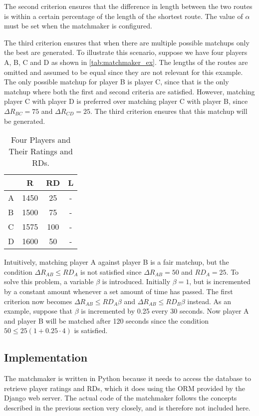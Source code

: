 The second criterion ensures that the difference in length between the two routes is within a certain percentage of the length of the shortest route.
The value of $\alpha$ must be set when the matchmaker is configured.

The third criterion ensures that when there are multiple possible matchups only the best are generated.
To illustrate this scenario, suppose we have four players A, B, C and D as shown in \autoref{tab:matchmaker_ex}.
The lengths of the routes are omitted and assumed to be equal since they are not relevant for this example.
The only possible matchup for player B is player C, since that is the only matchup where both the first and second criteria are satisfied.
However, matching player C with player D is preferred over matching player C with player B, since $\Delta R_{BC} = 75$ and $\Delta R_{CD} = 25$.
The third criterion ensures that this matchup will be generated.

\begin{table}[!ht]
	\centering
	\begin{tabular}{l c c c}
			& R		& RD	& L \\
		\hline
		A	& 1450	& 25	& - \\
		B	& 1500	& 75	& - \\
		C	& 1575	& 100	& - \\
		D	& 1600	& 50	& -
	\end{tabular}
	\caption{Four Players and Their Ratings and RDs.}
	\label{tab:matchmaker_ex}
\end{table}

Intuitively, matching player A against player B is a fair matchup, but the condition $\Delta R_{AB} \leq RD_A$ is not satisfied since $\Delta R_{AB} = 50$ and $RD_A = 25$.
To solve this problem, a variable $\beta$ is introduced.
Initially $\beta = 1$, but is incremented by a constant amount whenever a set amount of time has passed.
The first criterion now becomes $\Delta R_{AB} \leq RD_A\beta$ and $\Delta R_{AB} \leq RD_B\beta$ instead.
As an example, suppose that $\beta$ is incremented by 0.25 every 30 seconds.
Now player A and player B will be matched after 120 seconds since the condition $50 \leq 25\left(1+0.25\cdot4\right)$ is satisfied.

\subsection{Implementation}
The matchmaker is written in Python because it needs to access the database to retrieve player ratings and RDs, which it does using the ORM provided by the Django web server.
The actual code of the matchmaker follows the concepts described in the previous section very closely, and is therefore not included here.

